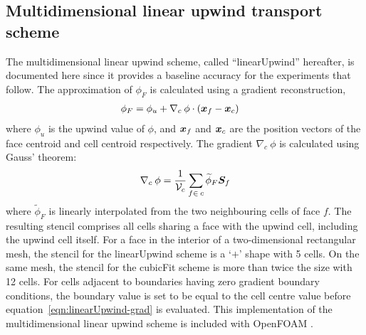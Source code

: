 \subsection{Multidimensional linear upwind transport scheme}

The multidimensional linear upwind scheme, called ``linearUpwind'' hereafter, is documented here since it provides a baseline accuracy for the experiments that follow.  The approximation of $\phi_F$ is calculated using a gradient reconstruction,
\begin{align}
	\phi_F &= \phi_u + \nabla_c\: \phi \cdot \left(\bm{x}_f - \bm{x}_c \right)
\end{align} 
where $\phi_u$ is the upwind value of $\phi$, and $\bm{x}_f$ and $\bm{x}_c$ are the position vectors of the face centroid and cell centroid respectively.
The gradient $\nabla_c \:\phi$ is calculated using Gauss' theorem:
\begin{align}
	\nabla_c\: \phi = \frac{1}{\mathcal{V}_c} \sum_{f\in\:c} \widetilde{\phi}_F \bm{S}_f \label{eqn:linearUpwind-grad}
\end{align}
where $\widetilde{\phi}_F$ is linearly interpolated from the two neighbouring cells of face $f$.
The resulting stencil comprises all cells sharing a face with the upwind cell, including the upwind cell itself.  For a face in the interior of a two-dimensional rectangular mesh, the stencil for the linearUpwind scheme is a `$+$' shape with 5 cells.  On the same mesh, the stencil for the cubicFit scheme is more than twice the size with 12 cells.
For cells adjacent to boundaries having zero gradient boundary conditions, the boundary value is set to be equal to the cell centre value before equation~\eqref{eqn:linearUpwind-grad} is evaluated.
This implementation of the multidimensional linear upwind scheme is included with OpenFOAM \citep{openfoam-numerics}.

